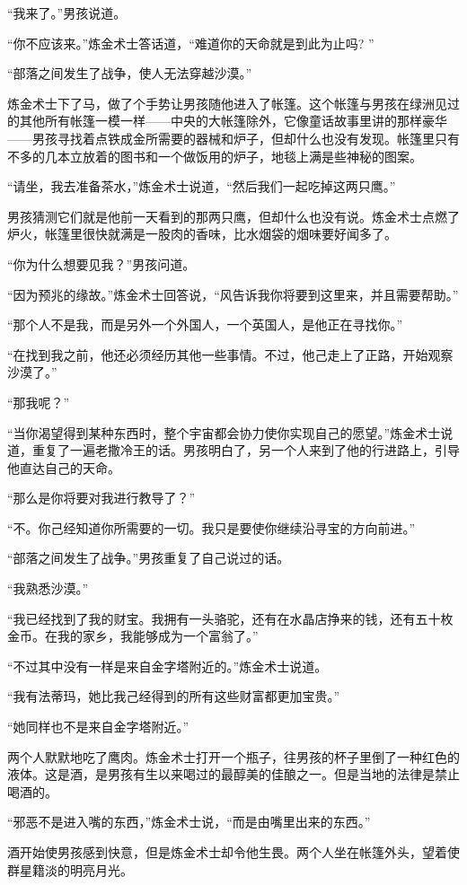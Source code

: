 \documentclass[twoside,openany]{book}
\begin{document}
“我来了。”男孩说道。

“你不应该来。”炼金术士答话道，“难道你的天命就是到此为止吗? ”

“部落之间发生了战争，使人无法穿越沙漠。”

炼金术士下了马，做了个手势让男孩随他进入了帐篷。这个帐篷与男孩在绿洲见过的其他所有帐篷一模一样——中央的大帐篷除外，它像童话故事里讲的那样豪华——男孩寻找着点铁成金所需要的器械和炉子，但却什么也没有发现。帐篷里只有不多的几本立放着的图书和一个做饭用的炉子，地毯上满是些神秘的图案。

“请坐，我去准备茶水，”炼金术士说道，“然后我们一起吃掉这两只鹰。”

男孩猜测它们就是他前一天看到的那两只鹰，但却什么也没有说。炼金术士点燃了炉火，帐篷里很快就满是一股肉的香味，比水烟袋的烟味要好闻多了。

“你为什么想要见我？”男孩问道。

“因为预兆的缘故。”炼金术士回答说，“风告诉我你将要到这里来，并且需要帮助。”

“那个人不是我，而是另外一个外国人，一个英国人，是他正在寻找你。”

“在找到我之前，他还必须经历其他一些事情。不过，他己走上了正路，开始观察沙漠了。”

“那我呢？”

“当你渴望得到某种东西时，整个宇宙都会协力使你实现自己的愿望。”炼金术士说道，重复了一遍老撒冷王的话。男孩明白了，另一个人来到了他的行进路上，引导他直达自己的天命。

“那么是你将要对我进行教导了？”

“不。你己经知道你所需要的一切。我只是要使你继续沿寻宝的方向前进。”

“部落之间发生了战争。”男孩重复了自己说过的话。

“我熟悉沙漠。”

“我已经找到了我的财宝。我拥有一头骆驼，还有在水晶店挣来的钱，还有五十枚金币。在我的家乡，我能够成为一个富翁了。”

“不过其中没有一样是来自金字塔附近的。”炼金术士说道。

“我有法蒂玛，她比我己经得到的所有这些财富都更加宝贵。”

“她同样也不是来自金字塔附近。”

两个人默默地吃了鹰肉。炼金术士打开一个瓶子，往男孩的杯子里倒了一种红色的液体。这是酒，是男孩有生以来喝过的最醇美的佳酿之一。但是当地的法律是禁止喝酒的。

“邪恶不是进入嘴的东西，”炼金术士说，“而是由嘴里出来的东西。”

酒开始使男孩感到快意，但是炼金术士却令他生畏。两个人坐在帐篷外头，望着使群星籍淡的明亮月光。
\end{document}
